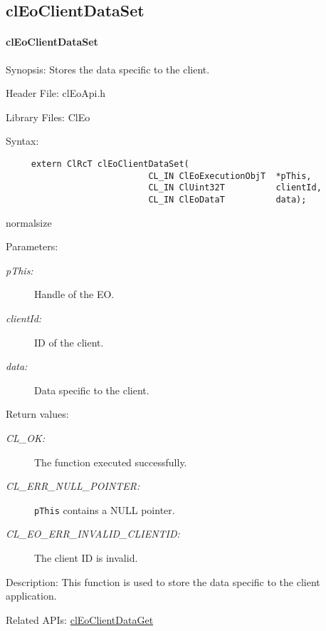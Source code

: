 \begin{flushleft}
  \newpage
\subsection{clEoClientDataSet}
\hypertarget{pageeo108}{}\paragraph{cl\-Eo\-Client\-Data\-Set}\label{pageeo108}
\begin{Desc}
\item[Synopsis:]Stores the data specific to the client.\end{Desc}
\begin{Desc}
\item[Header File:]clEoApi.h\end{Desc}
\begin{Desc}
\item[Library Files:]Cl\-Eo\end{Desc}
\begin{Desc}
\item[Syntax:]

\footnotesize\begin{verbatim}     extern ClRcT clEoClientDataSet(
                 			CL_IN ClEoExecutionObjT  *pThis,
                 			CL_IN ClUint32T          clientId,
                 			CL_IN ClEoDataT          data);
\end{verbatim}
  normalsize
\end{Desc}
\begin{Desc}
\item[Parameters:]
\begin{description}
\item[{\em p\-This:}]Handle of the EO. 
\item[{\em client\-Id:}]ID of the client.   
\item[{\em data:}]Data specific to the client.\end{description}
\end{Desc}
\begin{Desc}
\item[Return values:]
\begin{description}
\item[{\em CL\_\-OK:}]The function executed successfully. 
\item[{\em CL\_\-ERR\_\-NULL\_\-POINTER:}]{\tt{pThis}} contains a NULL pointer. 
\item[{\em CL\_\-EO\_\-ERR\_\-INVALID\_\-CLIENTID:}]The client ID is invalid.\end{description}
\end{Desc}
\begin{Desc}
\item[Description:]This function is used to store the data specific to the client application.\end{Desc}
\begin{Desc}
\item[Related APIs:]\hyperlink{pageeo109}{cl\-Eo\-Client\-Data\-Get} \end{Desc}





\end{flushleft}

